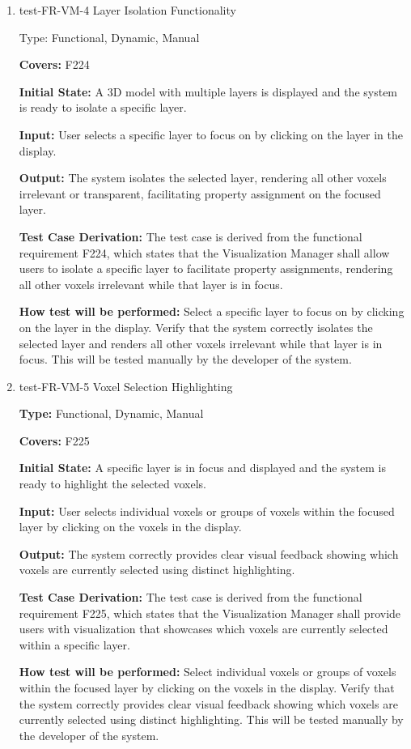 \documentclass[12pt, titlepage]{article}
\begin{document}
\begin{enumerate}

\item{test-FR-VM-4 Layer Isolation Functionality\\}

Type: Functional, Dynamic, Manual

\textbf{Covers:} F224
					
\textbf{Initial State:} A 3D model with multiple layers is displayed and the system is ready to isolate a specific layer.
					
\textbf{Input:} User selects a specific layer to focus on by clicking on the layer in the display.
					
\textbf{Output:} The system isolates the selected layer, rendering all other voxels irrelevant or transparent, facilitating property assignment on the focused layer.

\textbf{Test Case Derivation:} The test case is derived from the functional requirement F224, which states that the Visualization Manager shall allow users to isolate a specific layer to facilitate property assignments, rendering all other voxels irrelevant while that layer is in focus.
					
\textbf{How test will be performed:} Select a specific layer to focus on by clicking on the layer in the display. Verify that the system correctly isolates the selected layer and renders all other voxels irrelevant while that layer is in focus. This will be tested manually by the developer of the system.

\item{test-FR-VM-5 Voxel Selection Highlighting\\}

\textbf{Type:} Functional, Dynamic, Manual

\textbf{Covers:} F225
					
\textbf{Initial State:} A specific layer is in focus and displayed and the system is ready to highlight the selected voxels.
					
\textbf{Input:} User selects individual voxels or groups of voxels within the focused layer by clicking on the voxels in the display.
					
\textbf{Output:} The system correctly provides clear visual feedback showing which voxels are currently selected using distinct highlighting.

\textbf{Test Case Derivation:} The test case is derived from the functional requirement F225, which states that the Visualization Manager shall provide users with visualization that showcases which voxels are currently selected within a specific layer.
					
\textbf{How test will be performed:} Select individual voxels or groups of voxels within the focused layer by clicking on the voxels in the display. Verify that the system correctly provides clear visual feedback showing which voxels are currently selected using distinct highlighting. This will be tested manually by the developer of the system.

\end{enumerate}
\end{document}
